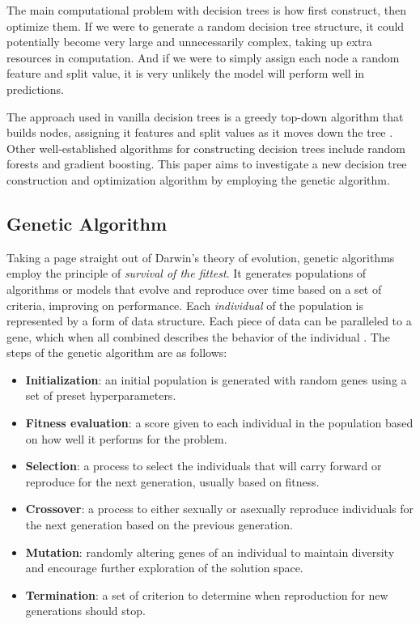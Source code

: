 \documentclass[12pt]{article}
\begin{document}
The main computational problem with decision trees is how first construct, then optimize them. If we were to generate a random decision tree structure, it could potentially become very large and unnecessarily complex, taking up extra resources in computation. And if we were to simply assign each node a random feature and split value, it is very unlikely the model will perform well in predictions.

The approach used in vanilla decision trees is a greedy top-down algorithm that builds nodes, assigning it features and split values as it moves down the tree \cite{dt_induction}. Other well-established algorithms for constructing decision trees include random forests and gradient boosting. This paper aims to investigate a new decision tree construction and optimization algorithm by employing the genetic algorithm.

\subsection{Genetic Algorithm}

Taking a page straight out of Darwin's theory of evolution, genetic algorithms employ the principle of \textit{survival of the fittest}. It generates populations of algorithms or models that evolve and reproduce over time based on a set of criteria, improving on performance. Each \textit{individual} of the population is represented by a form of data structure. Each piece of data can be paralleled to a gene, which when all combined describes the behavior of the individual \cite{intro_to_ga}. The steps of the genetic algorithm are as follows:

\begin{itemize}
    \item \textbf{Initialization}: an initial population is generated with random genes using a set of preset hyperparameters.
    \item \textbf{Fitness evaluation}: a score given to each individual in the population based on how well it performs for the problem.
    \item \textbf{Selection}: a process to select the individuals that will carry forward or reproduce for the next generation, usually based on fitness.
    \item \textbf{Crossover}: a process to either sexually or asexually reproduce individuals for the next generation based on the previous generation.
    \item \textbf{Mutation}: randomly altering genes of an individual to maintain diversity and encourage further exploration of the solution space.
    \item \textbf{Termination}: a set of criterion to determine when reproduction for new generations should stop.
\end{itemize}
\end{document}
